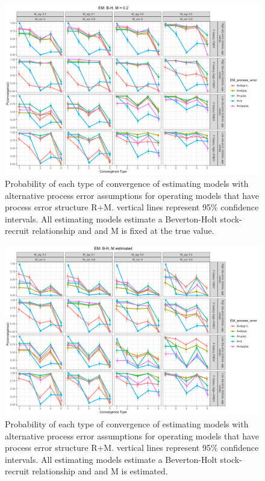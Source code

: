 \documentclass[
  12pt,
]{article}
\begin{document}
\begin{landscape}
\begin{figure}
\caption{Probability of each type of convergence of estimating models with alternative process error assumptions for operating models that have process error structure R+M. vertical lines represent 95\% confidence intervals. All estimating models estimate a Beverton-Holt stock-recruit relationship and and M is fixed at the true value.}\label{M_om_em_BH_MF_convergence}
\begin{center}
\includegraphics[width = \textwidth]{M_om_p_convergence_BH_M_fixed.png}
\end{center}
\end{figure}
\end{landscape}

\begin{landscape}
\begin{figure}
\caption{Probability of each type of convergence of estimating models with alternative process error assumptions for operating models that have process error structure R+M. vertical lines represent 95\% confidence intervals. All estimating models estimate a Beverton-Holt stock-recruit relationship and and M is estimated.}\label{M_om_em_BH_ME_convergence}
\begin{center}
\includegraphics[width = \textwidth]{M_om_p_convergence_BH_M_estimated.png}
\end{center}
\end{figure}
\end{landscape}
\end{document}
